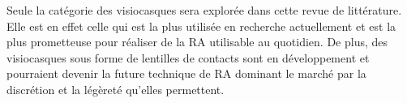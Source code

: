 
Seule la catégorie des visiocasques sera explorée dans cette revue de littérature. Elle est en effet celle qui est la plus utilisée en recherche actuellement et est la plus prometteuse pour réaliser de la RA utilisable au quotidien. \cite{CarmignianiFurhtAnisettiEtAl2011} De plus, des visiocasques sous forme de lentilles de contacts sont en développement et pourraient devenir la future technique de RA dominant le marché par la discrétion et la légèreté qu'elles permettent. \citep{VanKrevelenPoelman2010}